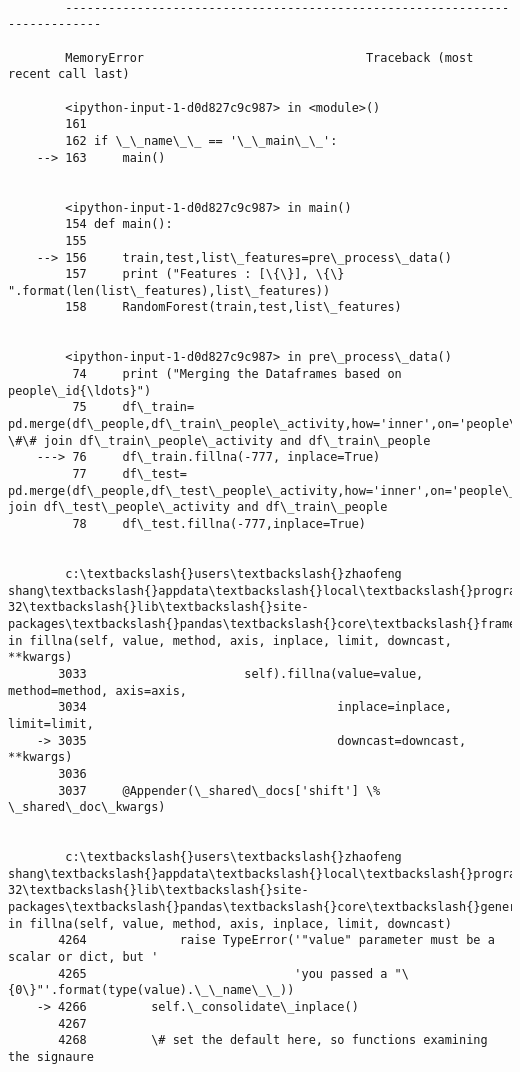 \documentclass[11pt]{article}
\begin{document}
    \begin{Verbatim}[commandchars=\\\{\}]

        ---------------------------------------------------------------------------

        MemoryError                               Traceback (most recent call last)

        <ipython-input-1-d0d827c9c987> in <module>()
        161 
        162 if \_\_name\_\_ == '\_\_main\_\_':
    --> 163     main()
    

        <ipython-input-1-d0d827c9c987> in main()
        154 def main():
        155 
    --> 156     train,test,list\_features=pre\_process\_data()
        157     print ("Features : [\{\}], \{\} ".format(len(list\_features),list\_features))
        158     RandomForest(train,test,list\_features)
    

        <ipython-input-1-d0d827c9c987> in pre\_process\_data()
         74     print ("Merging the Dataframes based on people\_id{\ldots}")
         75     df\_train= pd.merge(df\_people,df\_train\_people\_activity,how='inner',on='people\_id') \#\# join df\_train\_people\_activity and df\_train\_people
    ---> 76     df\_train.fillna(-777, inplace=True)
         77     df\_test= pd.merge(df\_people,df\_test\_people\_activity,how='inner',on='people\_id')\#\# join df\_test\_people\_activity and df\_train\_people
         78     df\_test.fillna(-777,inplace=True)
    

        c:\textbackslash{}users\textbackslash{}zhaofeng shang\textbackslash{}appdata\textbackslash{}local\textbackslash{}programs\textbackslash{}python\textbackslash{}python36-32\textbackslash{}lib\textbackslash{}site-packages\textbackslash{}pandas\textbackslash{}core\textbackslash{}frame.py in fillna(self, value, method, axis, inplace, limit, downcast, **kwargs)
       3033                      self).fillna(value=value, method=method, axis=axis,
       3034                                   inplace=inplace, limit=limit,
    -> 3035                                   downcast=downcast, **kwargs)
       3036 
       3037     @Appender(\_shared\_docs['shift'] \% \_shared\_doc\_kwargs)
    

        c:\textbackslash{}users\textbackslash{}zhaofeng shang\textbackslash{}appdata\textbackslash{}local\textbackslash{}programs\textbackslash{}python\textbackslash{}python36-32\textbackslash{}lib\textbackslash{}site-packages\textbackslash{}pandas\textbackslash{}core\textbackslash{}generic.py in fillna(self, value, method, axis, inplace, limit, downcast)
       4264             raise TypeError('"value" parameter must be a scalar or dict, but '
       4265                             'you passed a "\{0\}"'.format(type(value).\_\_name\_\_))
    -> 4266         self.\_consolidate\_inplace()
       4267 
       4268         \# set the default here, so functions examining the signaure
    


\end{Verbatim}
\end{document}
